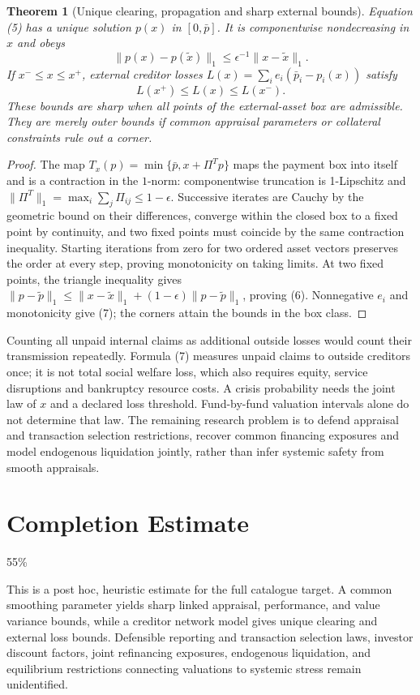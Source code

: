 \documentclass[11pt]{article}
\newtheorem{theorem}{Theorem}
\theoremstyle{remark}
\begin{document}
\begin{theorem}[Unique clearing, propagation and sharp external bounds]
Equation (5) has a unique solution $p(x)$ in $[0,\bar p]$. It is
componentwise nondecreasing in $x$ and obeys
\[
 \|p(x)-p(\widetilde x)\|_1\leq\epsilon^{-1}
           \|x-\widetilde x\|_1.                                  \tag{6}
\]
If $x^-\leq x\leq x^+$, external creditor losses
$L(x)=\sum_i e_i(\bar p_i-p_i(x))$ satisfy
\[
 L(x^+)\leq L(x)\leq L(x^-).                                     \tag{7}
\]
These bounds are sharp when all points of the external-asset box are
admissible. They are merely outer bounds if common appraisal parameters
or collateral constraints rule out a corner.
\end{theorem}
\begin{proof}
The map $T_x(p)=\min\{\bar p,x+\Pi^Tp\}$ maps the payment box into
itself and is a contraction in the $1$-norm: componentwise truncation is
1-Lipschitz and $\|\Pi^T\|_1=\max_i\sum_j\Pi_{ij}\leq1-\epsilon$.
Successive iterates are Cauchy by the geometric bound on their differences,
converge within the closed box to a fixed point by continuity, and two
fixed points must coincide by the same contraction inequality.
Starting iterations from zero for two ordered asset vectors preserves the
order at every step, proving monotonicity on taking limits. At two fixed
points, the triangle inequality gives
$\|p-\widetilde p\|_1\leq\|x-\widetilde x\|_1+
(1-\epsilon)\|p-\widetilde p\|_1$, proving (6).
Nonnegative $e_i$ and monotonicity give (7); the corners attain the
bounds in the box class.
\end{proof}
Counting all unpaid internal claims as additional outside losses would
count their transmission repeatedly. Formula (7) measures unpaid claims
to outside creditors once; it is not total social welfare loss, which also
requires equity, service disruptions and bankruptcy resource costs.
A crisis probability needs the joint law of $x$ and a declared loss
threshold. Fund-by-fund valuation intervals alone do not determine that
law. The remaining research problem is to defend appraisal and transaction
selection restrictions, recover common financing exposures and model
endogenous liquidation jointly, rather than infer systemic safety from
smooth appraisals.

\section{Completion Estimate}
55\%

This is a post hoc, heuristic estimate for the full catalogue target.
A common smoothing parameter yields sharp linked appraisal, performance, and value variance bounds, while a creditor network model gives unique clearing and external loss bounds. Defensible reporting and transaction selection laws, investor discount factors, joint refinancing exposures, endogenous liquidation, and equilibrium restrictions connecting valuations to systemic stress remain unidentified.
\end{document}
